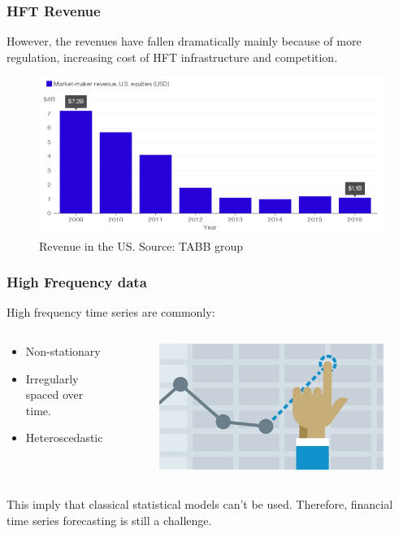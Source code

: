 \documentclass{beamer}
\begin{document}
\begin{frame}
\frametitle{HFT Revenue}
However, the revenues have fallen dramatically mainly because of more regulation, increasing cost of HFT infrastructure and competition.
\begin{figure}
\includegraphics[width=0.7\paperwidth]{img/HFTmarket2}
\caption{Revenue in the US. Source: TABB group}
\end{figure}
\end{frame}


\begin{frame}
\frametitle{High Frequency data}
High frequency time series are commonly:
\begin{columns}
\begin{column}{0.5\textwidth}
\begin{itemize}
\item Non-stationary
\item Irregularly spaced over time.
\item Heteroscedastic
\end{itemize}
\end{column}
\begin{column}{0.5\textwidth}
\begin{figure}
\includegraphics[width=0.35\paperwidth]{img/forecast}
\end{figure}
\end{column}
\end{columns}
\vspace{5mm}
This imply that classical statistical models can't be used. Therefore, financial time series forecasting is still a challenge.
\end{frame}
\end{document}
